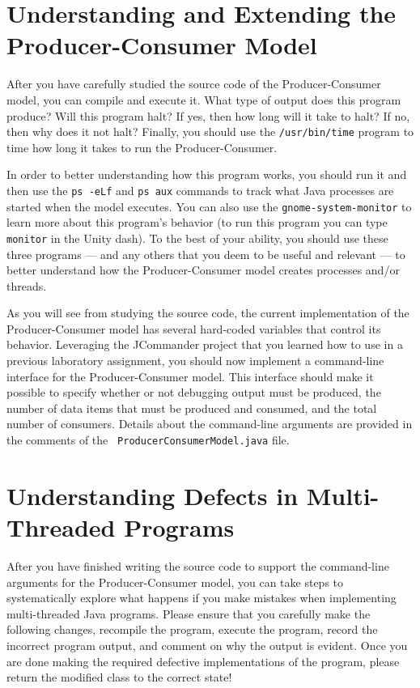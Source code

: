 \section*{Understanding and Extending the Producer-Consumer Model}

After you have carefully studied the source code of the Producer-Consumer model, you can compile and execute it.  What type of
output does this program produce?  Will this program halt?  If yes, then how long will it take to halt?  If no, then why does it
not halt? Finally, you should use the {\tt /usr/bin/time} program to time how long it takes to run the Producer-Consumer.

In order to better understanding how this program works, you should run it and then use the {\tt ps -eLf} and {\tt ps aux}
commands to track what Java processes are started when the model executes. You can also use the {\tt gnome-system-monitor} to
learn more about this program's behavior (to run this program you can type {\tt monitor} in the Unity dash).  To the best of your
ability, you should use these three programs --- and any others that you deem to be useful and relevant --- to better understand
how the Producer-Consumer model creates processes and/or threads.

As you will see from studying the source code, the current implementation of the Producer-Consumer model has several hard-coded
variables that control its behavior. Leveraging the JCommander project that you learned how to use in a previous laboratory
assignment, you should now implement a command-line interface for the Producer-Consumer model.  This interface should make it
possible to specify whether or not debugging output must be produced, the number of data items that must be produced and consumed,
and the total number of consumers.  Details about the command-line arguments are provided in the comments of the {\tt
ProducerConsumerModel.java} file. 

\section*{Understanding Defects in Multi-Threaded Programs}

After you have finished writing the source code to support the command-line arguments for the Producer-Consumer model, you can
take steps to systematically explore what happens if you make mistakes when implementing multi-threaded Java programs. Please
ensure that you carefully make the following changes, recompile the program, execute the program, record the incorrect program
output, and comment on why the output is evident.  Once you are done making the required defective implementations of the program,
please return the modified class to the correct state!

